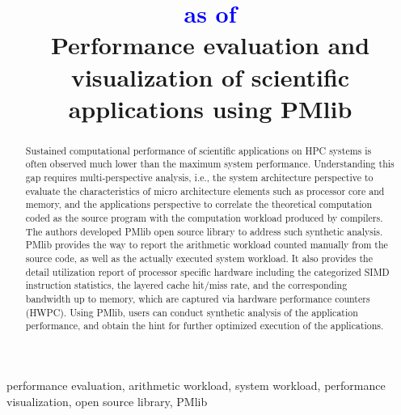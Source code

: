 \documentclass[conference]{IEEEtran}
\begin{document}
\title{
\textcolor{blue}{as of \DTMnow} \\
Performance evaluation and visualization of scientific applications using PMlib
}

\author{
\and
{}
}

\maketitle

\begin{abstract}
Sustained computational performance of scientific applications on HPC systems
is often observed much lower than the maximum system performance.
Understanding this gap requires multi-perspective analysis, i.e., the system
architecture perspective to evaluate the characteristics of micro architecture
elements such as processor core and memory, and the applications perspective
to correlate the theoretical computation coded as the source program with the
computation workload produced by compilers.
The authors developed PMlib open source library to address such synthetic analysis.
PMlib provides the way to report the arithmetic workload counted manually from
the source code, as well as the actually executed system workload.
It also provides the detail utilization report of processor specific hardware
including the categorized SIMD instruction statistics, the layered cache
hit/miss rate, and the corresponding bandwidth up to memory,
which are captured via hardware performance counters (HWPC).
Using PMlib, users can conduct synthetic analysis of the application
performance, and obtain the hint for further optimized execution of
the applications.
\end{abstract}

\begin{IEEEkeywords}
performance evaluation,
arithmetic workload,
system workload,
performance visualization,
open source library,
PMlib
\end{IEEEkeywords}
\end{document}
